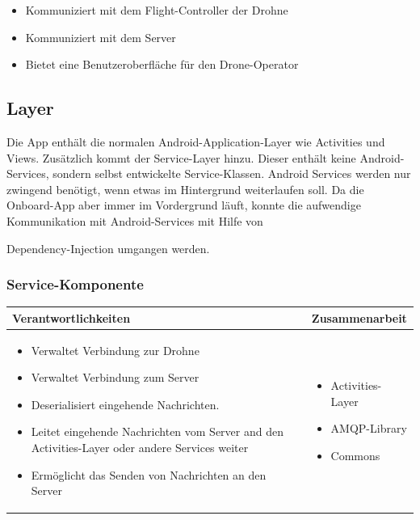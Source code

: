 \begin{itemize}
	\item Kommuniziert mit dem Flight-Controller der Drohne
	\item Kommuniziert mit dem Server
	\item Bietet eine Benutzeroberfläche für den Drone-Operator 
\end{itemize}

\subsection{Layer}

Die App enthält die normalen Android-Application-Layer wie Activities und Views. Zusätzlich kommt der Service-Layer hinzu. Dieser enthält keine Android-Services, sondern selbst entwickelte Service-Klassen. Android Services werden nur zwingend benötigt, wenn etwas im Hintergrund weiterlaufen soll. Da die Onboard-App aber immer im Vordergrund läuft, konnte die aufwendige Kommunikation mit Android-Services mit Hilfe von {Dependency-Injection \cite{DI} umgangen werden.\\

\subsubsection{Service-Komponente}

\begin{tabular}{|p{}|p{}|} \hline
	\textbf{Verantwortlichkeiten} & \textbf{Zusammenarbeit} \\ \hline \hline
	
	\begin{itemize}
		\item Verwaltet Verbindung zur Drohne
		\item Verwaltet Verbindung zum Server
		\item Deserialisiert eingehende Nachrichten.
		\item Leitet eingehende Nachrichten vom Server and den Activities-Layer oder andere Services weiter
		\item Ermöglicht das Senden von Nachrichten an den Server
	\end{itemize}&
	\begin{itemize}
		\item Activities-Layer
		\item AMQP-Library
		\item Commons
	\end{itemize}
	\\ \hline
\end{tabular}


}
